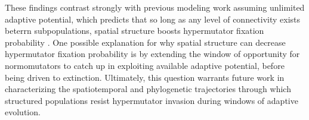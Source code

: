 These findings contrast strongly with previous modeling work assuming unlimited adaptive potential, which predicts that so long as any level of connectivity exists beterrn subpopulations, spatial structure boosts hypermutator fixation probability \citep{raynes2019migration}.
One possible explanation for why spatial structure can decrease hypermutator fixation probability is by extending the window of opportunity for normomutators to catch up in exploiting available adaptive potential, before being driven to extinction.
Ultimately, this question warrants future work in characterizing the spatiotemporal and phylogenetic trajectories through which structured populations resist hypermutator invasion during windows of adaptive evolution.
